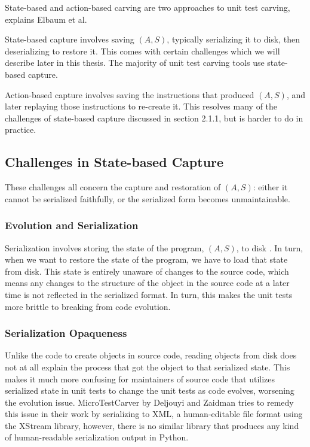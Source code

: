 
State-based and action-based carving are two approaches to unit test carving, explains Elbaum et al.

State-based capture involves saving $(A, S)$, typically serializing it to disk, then deserializing to
restore it. This comes with certain challenges which we will describe later in this thesis. The majority
of unit test carving tools use state-based capture.

Action-based capture involves saving the instructions that produced $(A, S)$, and later replaying those
instructions to re-create it. This resolves many of the challenges of state-based capture discussed in
section 2.1.1, but is harder to do in practice.


\subsection{Challenges in State-based Capture}

These challenges all concern the capture and restoration of $(A, S)$: either it cannot be serialized
faithfully, or the serialized form becomes unmaintainable.

\subsubsection{Evolution and Serialization}
Serialization involves storing the state of the program, $(A, S)$, to disk \cite{isocppserialization}. In turn, when we
want to restore the state of the
program, we have to load that state from disk. This state is entirely unaware of changes to the source code,
which means any changes to the structure
of the object in the source code at a later time is not reflected in the serialized format. In turn, this
makes the unit tests more brittle to
breaking from code evolution.

\subsubsection{Serialization Opaqueness}
Unlike the code to create objects in source code, reading objects from disk does not at all explain the
process that got the object to that
serialized state. This makes it much more confusing for maintainers of source code that utilizes serialized
state in unit tests to change the unit
tests as code evolves, worsening the evolution issue.
MicroTestCarver by Deljouyi and Zaidman \cite{deljouyi2023generating} tries to remedy this issue in their
work by serializing to XML, a
human-editable file format using the XStream library, however, there is no similar library that produces any
kind of human-readable serialization
output in Python.

